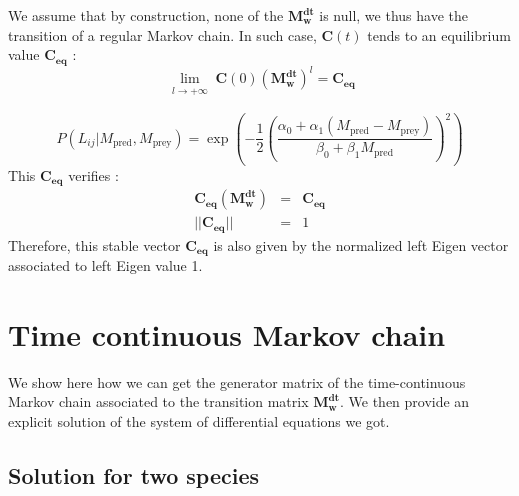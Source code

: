 We assume that by construction, none of the $\mathbf{M^{dt}_w}$ is null, we thus have the transition of a regular Markov chain. In such case, $\mathbf{C}(t)$ tends to an equilibrium value $\mathbf{C_{eq}}$ :
\begin{equation}
\lim\limits_{\substack{l \to +\infty }} \mathbf{C}(0)(\mathbf{M^{dt}_w})^l=\mathbf{C_{eq}}
\end{equation}

\begin{equation}
P(L_{ij}|M_{\text{pred}}, M_{\text{prey}})=\exp\left(-\frac{1}{2}\left(\frac{\alpha_0+\alpha_1(M_{\text{pred}}- M_{\text{prey}})}{\beta_0+\beta_1M_{\text{pred}}}\right)^2\right)
\end{equation}
This $\mathbf{C_{eq}}$ verifies :
\begin{eqnarray}
\mathbf{C_{eq}}(\mathbf{M^{dt}_w}) &=& \mathbf{C_{eq}} \\
||\mathbf{C_{eq}}|| &=& 1
\end{eqnarray}
Therefore, this stable vector $\mathbf{C_{eq}}$ is also given by the normalized left Eigen vector associated to left Eigen value 1.



\section{Time continuous Markov chain}

We show here how we can get the generator matrix of the time-continuous Markov chain associated to the transition matrix $\mathbf{M^{dt}_w}$. We then provide an explicit solution of the system of differential equations we got.

\subsection{Solution for two species}

